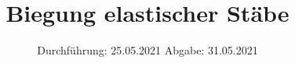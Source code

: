 

\subject{V103}
\title{Biegung elastischer Stäbe}
\date{%
  Durchführung: 25.05.2021
  \hspace{3em}
  Abgabe: 31.05.2021
}



\maketitle
\thispagestyle{empty}
\tableofcontents
\newpage






\printbibliography{}

